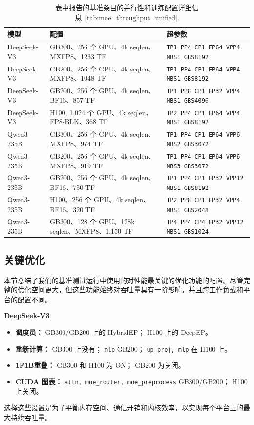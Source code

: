 \begin{table}[t]
\centering
\small
\caption{表中报告的基准条目的并行性和训练配置详细信息~\ref{tab:moe_throughput_unified}.}
\label{tab:appendix_showcase_configs}
\begin{tabular}{lll}
\toprule
模型 & 配置 & 超参数 \\
\midrule
DeepSeek-V3 & GB300、256 个 GPU、4k seqlen、MXFP8、1233 TF      & \texttt{TP1 PP4 CP1 EP64 VPP4 MBS1 GBS8192} \\
DeepSeek-V3 & GB200、256 个 GPU、4k seqlen、MXFP8、1048 TF      & \texttt{TP1 PP4 CP1 EP64 VPP4 MBS1 GBS8192} \\
DeepSeek-V3 & GB200、256 个 GPU、4k seqlen、BF16、857 TF        & \texttt{TP1 PP8 CP1 EP32 VPP4 MBS1 GBS4096} \\
DeepSeek-V3 & H100, 1{,}024 个 GPU、4k seqlen、FP8-BLK、368 TF  & \texttt{TP2 PP4 CP1 EP64 VPP4 MBS1 GBS8192} \\
\midrule
Qwen3-235B & GB300、256 个 GPU、4k seqlen、MXFP8、974 TF        & \texttt{TP1 PP4 CP1 EP64 VPP\phantom{0}6 MBS2 GBS3072} \\
Qwen3-235B & GB200、256 个 GPU、4k seqlen、MXFP8、919 TF        & \texttt{TP1 PP4 CP1 EP64 VPP\phantom{0}6 MBS3 GBS3072} \\
Qwen3-235B & GB200、256 个 GPU、4k seqlen、BF16、750 TF         & \texttt{TP1 PP4 CP1 EP32 VPP12 MBS1 GBS8192} \\
Qwen3-235B & H100、256 个 GPU、4k seqlen、BF16、320 TF          & \texttt{TP2 PP8 CP1 EP32 VPP\phantom{0}4 MBS1 GBS2048} \\
\midrule
Qwen3-235B & GB300、128 个 GPU、128k seqlen、MXFP8、1{,}150 TF    & \texttt{TP4 PP4 CP4 EP32 VPP12 MBS1 GBS1024} \\
\bottomrule
\end{tabular}
\end{table}

\subsection{关键优化} 
本节总结了我们的基准测试运行中使用的对性能最关键的优化功能的配置。尽管完整的优化空间更大，但这些功能始终对吞吐量具有一阶影响，并且跨工作负载和平台的配置不同。

\textbf{DeepSeek-V3}
\begin{itemize}[noitemsep,topsep=0pt]
    \item \textbf{调度员：} GB300/GB200 上的 HybridEP； H100 上的 DeepEP。
    \item \textbf{重新计算：} GB300 上没有； \texttt{mlp} GB200； \texttt{up\_proj, mlp} 在 H100 上。
    \item \textbf{1F1B重叠：} GB300 和 H100 为 ON； GB200 为关闭。
    \item \textbf{CUDA 图表：} \texttt{attn, moe\_router, moe\_preprocess} GB300/GB200； H100 上关闭。
\end{itemize}
选择这些设置是为了平衡内存空间、通信开销和内核效率，以实现每个平台上的最大持续吞吐量。

